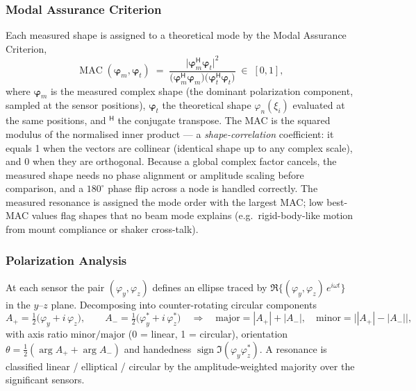 \subsubsection{Modal Assurance Criterion}
Each measured shape is assigned to a theoretical mode by the Modal Assurance
Criterion,
\begin{equation}
  \operatorname{MAC}(\boldsymbol{\varphi}_m, \boldsymbol{\varphi}_t)
  \;=\;
  \frac{\bigl|\boldsymbol{\varphi}_m^{\mathsf{H}}
              \boldsymbol{\varphi}_t\bigr|^2}
       {\bigl(\boldsymbol{\varphi}_m^{\mathsf{H}}\boldsymbol{\varphi}_m\bigr)
        \bigl(\boldsymbol{\varphi}_t^{\mathsf{H}}\boldsymbol{\varphi}_t\bigr)}
  \;\in\; [0, 1],
  \label{eq:mac}
\end{equation}
where $\boldsymbol{\varphi}_m$ is the measured complex shape (the dominant
polarization component, sampled at the sensor positions),
$\boldsymbol{\varphi}_t$ the theoretical shape $\varphi_n(\xi_i)$ evaluated
at the same positions, and $^{\mathsf{H}}$ the conjugate transpose. The MAC
is the squared modulus of the normalised inner product — a
\emph{shape-correlation} coefficient: it equals 1 when the vectors are
collinear (identical shape up to any complex scale), and 0 when they are
orthogonal. Because a global complex factor cancels, the measured shape
needs no phase alignment or amplitude scaling before comparison, and a
$180^\circ$ phase flip across a node is handled correctly. The measured
resonance is assigned the mode order with the largest MAC; low best-MAC
values flag shapes that no beam mode explains (e.g.\ rigid-body-like motion
from mount compliance or shaker cross-talk).

\subsubsection{Polarization Analysis}
At each sensor the pair $(\varphi_y, \varphi_z)$ defines an ellipse traced
by $\Re\{(\varphi_y, \varphi_z)\, e^{i\omega t}\}$ in the $y$--$z$ plane.
Decomposing into counter-rotating circular components
\begin{equation}
  A_+ = \tfrac{1}{2}\bigl(\varphi_y + i\,\varphi_z\bigr),
  \qquad
  A_- = \tfrac{1}{2}\bigl(\varphi_y^* + i\,\varphi_z^*\bigr)
  \quad\Longrightarrow\quad
  \text{major} = |A_+| + |A_-|,\quad
  \text{minor} = \bigl||A_+| - |A_-|\bigr|,
  \label{eq:ellipse}
\end{equation}
with axis ratio $\mathrm{minor}/\mathrm{major}$ (0 = linear, 1 = circular),
orientation $\theta = \tfrac{1}{2}(\arg A_+ + \arg A_-)$ and handedness
$\operatorname{sign}\Im(\varphi_y \varphi_z^*)$. A resonance is classified
linear / elliptical / circular by the amplitude-weighted majority over the
significant sensors.

